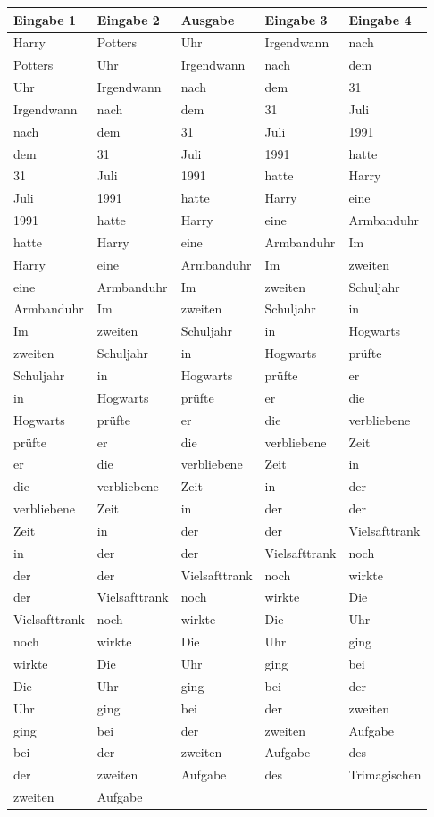 \documentclass{article}
\begin{document}
\pagestyle{empty}

\Large

\color{Gold}

\begin{longtable}{
  >{\columncolor{Black}}l
  >{\columncolor{Black}}l
  >{\columncolor{Grey}}l
  >{\columncolor{Black}}l
  >{\columncolor{Black}}l
}

\harrypotterfont\textbf{Eingabe 1} & \harrypotterfont\textbf{Eingabe 2} & \harrypotterfont\textbf{Ausgabe} & \harrypotterfont\textbf{Eingabe 3} & \harrypotterfont\textbf{Eingabe 4} \\
\hline
Harry & Potters & Uhr & Irgendwann & nach\\Potters & Uhr & Irgendwann & nach & dem\\Uhr & Irgendwann & nach & dem & 31\\Irgendwann & nach & dem & 31 & Juli\\nach & dem & 31 & Juli & 1991\\dem & 31 & Juli & 1991 & hatte\\31 & Juli & 1991 & hatte & Harry\\Juli & 1991 & hatte & Harry & eine\\1991 & hatte & Harry & eine & Armbanduhr\\hatte & Harry & eine & Armbanduhr & Im\\Harry & eine & Armbanduhr & Im & zweiten\\eine & Armbanduhr & Im & zweiten & Schuljahr\\Armbanduhr & Im & zweiten & Schuljahr & in\\Im & zweiten & Schuljahr & in & Hogwarts\\zweiten & Schuljahr & in & Hogwarts & prüfte\\Schuljahr & in & Hogwarts & prüfte & er\\in & Hogwarts & prüfte & er & die\\Hogwarts & prüfte & er & die & verbliebene\\prüfte & er & die & verbliebene & Zeit\\er & die & verbliebene & Zeit & in\\die & verbliebene & Zeit & in & der\\verbliebene & Zeit & in & der & der\\Zeit & in & der & der & Vielsafttrank\\in & der & der & Vielsafttrank & noch\\der & der & Vielsafttrank & noch & wirkte\\der & Vielsafttrank & noch & wirkte & Die\\Vielsafttrank & noch & wirkte & Die & Uhr\\noch & wirkte & Die & Uhr & ging\\wirkte & Die & Uhr & ging & bei\\Die & Uhr & ging & bei & der\\Uhr & ging & bei & der & zweiten\\ging & bei & der & zweiten & Aufgabe\\bei & der & zweiten & Aufgabe & des\\der & zweiten & Aufgabe & des & Trimagischen\\zweiten & Aufgabe 
\end{longtable}
\end{document}

